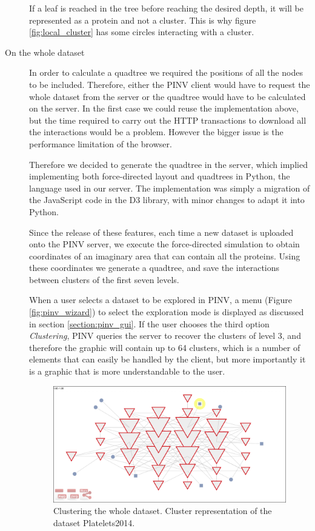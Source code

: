 \begin{description}
If a leaf is reached in the tree before reaching the desired depth, it will be represented as a protein and not a cluster. This is why figure \ref{fig:local_cluster} has some circles interacting with a cluster.

\item[On the whole dataset]
In order to calculate a quadtree we required the positions of all the nodes to be included. Therefore, either the PINV client would have to request the whole dataset from the server or the quadtree would have to be calculated on the server. In the first case we could reuse the implementation above, but the time required to carry out the HTTP transactions to download all the interactions would be a problem. However the bigger issue is the performance limitation of the browser.

Therefore we decided to generate the quadtree in the server, which implied implementing both force-directed layout and quadtrees in Python, the language used in our server. The implementation was simply a migration of the JavaScript code in the D3 library, with minor changes to adapt it into Python.

Since the release of these features, each time a new dataset is uploaded onto the PINV server, we execute the force-directed simulation to obtain coordinates of an imaginary area that can contain all the proteins. Using these coordinates we generate a quadtree, and save the interactions between clusters of the first seven levels.

When a user selects a dataset to be explored in PINV, a menu (Figure \ref{fig:pinv_wizard}) to select the exploration mode is displayed as discussed in section \ref{section:pinv_gui}. If the user chooses the third option \emph{Clustering}, PINV queries the server to recover the clusters of level 3, and therefore the graphic will contain up to 64 clusters, which is a number of elements that can easily be handled by the client, but more importantly it is a  graphic that is more understandable to the user.

\begin{figure}[ht]
\centering
\includegraphics[width=\textwidth]{figures/dataset_cluster.png}
\caption[Clustering the whole dataset.]{Clustering the whole dataset. Cluster representation of the dataset Platelets2014.
\label{fig:dataset_cluster}}
\end{figure}


\end{description}
